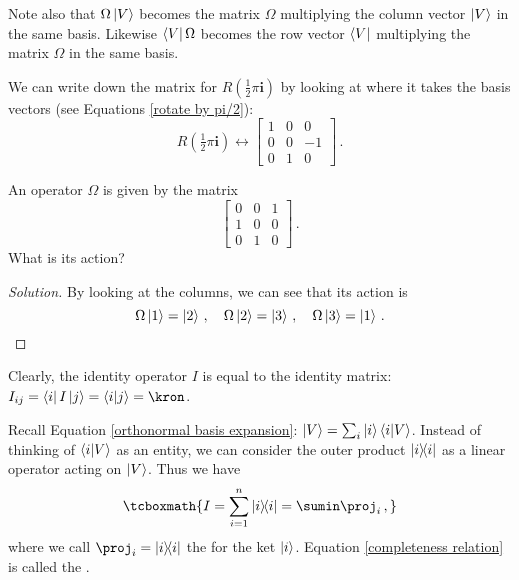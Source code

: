 Note also that $\Omega \ket{V}$ becomes the matrix $\Omega$ multiplying the column vector $\ket{V}$ in the same basis. Likewise $\bra{V} \Omega$ becomes the row vector $\bra{V}$ multiplying the matrix $\Omega$ in the same basis.

\begin{example}
We can write down the matrix for $R(\frac{1}{2}\pi \bm{i})$ by looking at where it takes the basis vectors (see Equations \eqref{rotate by pi/2}):
\begin{equation}
    R(\tfrac{1}{2}\pi \bm{i}) \leftrightarrow
    \begin{bmatrix}
    1 & 0 & 0 \\
    0 & 0 & -1 \\
    0 & 1 & 0
    \end{bmatrix}\,.
\end{equation}
\end{example}

\begin{exercise}
An operator $\Omega$ is given by the matrix
\begin{equation}
    \begin{bmatrix}
    0 & 0 & 1 \\
    1 & 0 & 0 \\
    0 & 1 & 0
    \end{bmatrix}\,.
\end{equation}
What is its action?
\end{exercise}

\begin{proof}[Solution]
By looking at the columns, we can see that its action is
\begin{equation}
    \Omega \ket{1} = \ket{2}\,, \quad \Omega \ket{2} = \ket{3}\,, \quad \Omega \ket{3} = \ket{1}\,.
\end{equation}
\end{proof}

Clearly, the identity operator $I$ is equal to the identity matrix: $I_{ij} = \bra{i}I\ket{j} = \braket{i}{j} = \kron$.

Recall Equation \eqref{orthonormal basis expansion}: $\ket{V} = \sum_i \ket{i} \braket{i}{V}$. Instead of thinking of $\braket{i}{V}$ as an entity, we can consider the outer product $\ketbra{i}$ as a linear operator acting on $\ket{V}$. Thus we have
\begin{equation}\label{completeness relation}
    \tcboxmath{I = \sum^n_{i = 1} \ketbra{i} = \sumin \proj_i\,,}
\end{equation}
where we call $\proj_i = \ketbra{i}$ the  for the ket $\ket{i}$. Equation \eqref{completeness relation} is called the .

